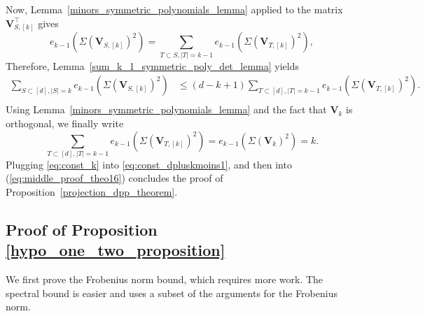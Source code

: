 \documentclass[twoside,11pt]{book}
\numberwithin{theorem}{chapter}
\numberwithin{definition}{chapter}
\numberwithin{proposition}{chapter}
\numberwithin{corollary}{chapter}
\numberwithin{example}{chapter}
\numberwithin{lemma}{chapter}
\numberwithin{assumption}{chapter}
\DeclareMathOperator{\Det}{Det}
\DeclareMathOperator{\Tran}{\intercal}
\begin{document}
Now, Lemma~\ref{minors_symmetric_polynomials_lemma} applied to the matrix $\bm{V}^{\Tran}_{S,[k]}$ gives
\begin{equation}
	e_{k-1}(\Sigma(\bm{V}_{S,[k]})^{2}) = \sum\limits_{T \subset S, |T| = k-1} e_{k-1}(\Sigma(\bm{V}_{T,[k]})^{2}),
\end{equation}
Therefore, Lemma~\ref{sum_k_1_symmetric_poly_det_lemma} yields
\begin{equation}
\label{eq:const_dpluskmoins1}
\begin{split}
\sum\limits_{S \subset [d], |S| = k} e_{k-1}(\Sigma(\bm{V}_{S,[k]})^{2})
  & \leq (d-k+1)\sum\limits_{T \subset [d], |T| = k-1} e_{k-1}(\Sigma(\bm{V}_{T,[k]})^{2}).\\
\end{split}
\end{equation}
Using Lemma~\ref{minors_symmetric_polynomials_lemma} and the fact that $\bm{V}_{k}$ is orthogonal, we finally write
\begin{equation}
\label{eq:const_k}
\sum\limits_{T \subset [d], |T| = k-1} e_{k-1}(\Sigma(\bm{V}_{T,[k]})^{2}) = e_{k-1}(\Sigma(\bm{V}_{k})^{2}) = k.
\end{equation}
Plugging \eqref{eq:const_k} into \eqref{eq:const_dpluskmoins1}, and then into (\ref{eq:middle_proof_theo16}) concludes the proof of Proposition~\ref{projection_dpp_theorem}.

\subsection{Proof of Proposition \ref{hypo_one_two_proposition}}
\label{s:proofOfExactSparsitySetting}
We first prove the Frobenius norm bound, which requires more work. The spectral bound is easier and uses a subset of the arguments for the Frobenius norm.
\end{document}
